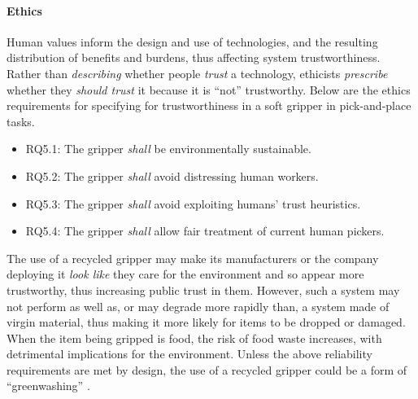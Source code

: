 \documentclass[lettersize,journal]{IEEEtran}
\begin{document}

\paragraph{Ethics}\label{ethics}
Human values inform the design and use of technologies, and the resulting distribution of benefits and burdens, thus affecting system trustworthiness. Rather than \emph{describing} whether people \emph{trust} a technology, ethicists \emph{prescribe} whether they \emph{should trust} it because it is ``not'' trustworthy. Below are the ethics requirements for specifying for trustworthiness in a soft gripper in pick-and-place tasks.
\begin{itemize}
	\item RQ5.1: The gripper \emph{shall} 
        be environmentally sustainable. 
        \item RQ5.2: The gripper \emph{shall} avoid distressing human workers.
        \item RQ5.3: The gripper \emph{shall} avoid exploiting humans’ trust heuristics.
        \item RQ5.4: The gripper \emph{shall} allow fair treatment of current human pickers.
\end{itemize}

The use of a recycled gripper may make its manufacturers or the company deploying it \emph{look like} they care for the environment and so appear more trustworthy, thus increasing public trust in them. However, such a system may not perform as well as, or may degrade more rapidly than, a system made of virgin material, thus making it more likely for items to be dropped or damaged. When the item being gripped is food, the risk of food waste increases, with detrimental implications for the environment. Unless the above reliability requirements  are met by design, the use of a recycled gripper could be a form of “greenwashing” \cite{delmas2011drivers}.    
\end{document}
